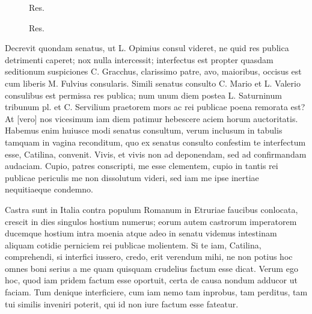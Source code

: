 \documentclass[12pt, twoside]{article}
\begin{document}
\begin{figure}
\FigureComplexThingThatYouCantVisualise
\caption{Res.}
\end{figure}
\begin{figure}
\FigureRotationAdjointRep
\caption{Res.}
\end{figure}
Decrevit quondam senatus, ut L. Opimius consul videret, ne quid res publica detrimenti caperet; nox nulla intercessit; interfectus est propter quasdam seditionum suspiciones C. Gracchus, clarissimo patre, avo, maioribus, occisus est cum liberis M. Fulvius consularis. Simili senatus consulto C. Mario et L. Valerio consulibus est permissa res publica; num unum diem postea L. Saturninum tribunum pl. et C. Servilium praetorem mors ac rei publicae poena remorata est? At [vero] nos vicesimum iam diem patimur hebescere aciem horum auctoritatis. Habemus enim huiusce modi senatus consultum, verum inclusum in tabulis tamquam in vagina reconditum, quo ex senatus consulto confestim te interfectum esse, Catilina, convenit. Vivis, et vivis non ad deponendam, sed ad confirmandam audaciam. Cupio, patres conscripti, me esse clementem, cupio in tantis rei publicae periculis me non dissolutum videri, sed iam me ipse inertiae nequitiaeque condemno.

Castra sunt in Italia contra populum Romanum in Etruriae faucibus conlocata, crescit in dies singulos hostium numerus; eorum autem castrorum imperatorem ducemque hostium intra moenia atque adeo in senatu videmus intestinam aliquam cotidie perniciem rei publicae molientem. Si te iam, Catilina, comprehendi, si interfici iussero, credo, erit verendum mihi, ne non potius hoc omnes boni serius a me quam quisquam crudelius factum esse dicat. Verum ego hoc, quod iam pridem factum esse oportuit, certa de causa nondum adducor ut faciam. Tum denique interficiere, cum iam nemo tam inprobus, tam perditus, tam tui similis inveniri poterit, qui id non iure factum esse fateatur.
\end{document}
